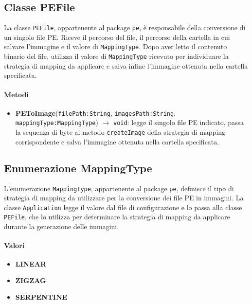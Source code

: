\subsection{Classe PEFile}

La classe \texttt{PEFile}, appartenente al package \texttt{pe}, è
responsabile della conversione di un singolo file PE. Riceve il percorso
del file, il percorso della cartella in cui
salvare l’immagine e il valore di \texttt{MappingType}. Dopo aver letto il
contenuto binario del file, utilizza il valore di \texttt{MappingType}
ricevuto per individuare la strategia di mapping da applicare e salva infine
l’immagine ottenuta nella cartella specificata.

\paragraph{Metodi}

\begin{itemize}
    \raggedright
    \item \textbf{PEToImage}(\texttt{filePath:String},
    \texttt{imagesPath:String}, \texttt{mappingType:MappingType})
    $\rightarrow$ \texttt{void}: legge il singolo file PE indicato,
    passa la sequenza di byte al metodo \texttt{createImage} della strategia di mapping corrispondente 
    e salva l'immagine ottenuta nella cartella specificata.
\end{itemize}

\subsection{Enumerazione MappingType}

L’enumerazione \texttt{MappingType}, appartenente al package \texttt{pe},
definisce il tipo di strategia di mapping da utilizzare per la conversione
dei file PE in immagini. La classe \texttt{Application} legge il valore dal
file di configurazione e lo passa alla classe \texttt{PEFile}, che lo utilizza
per determinare la strategia di mapping da applicare durante la generazione
delle immagini.

\paragraph{Valori}

\begin{itemize}
    \raggedright
    \item \textbf{LINEAR}
    \item \textbf{ZIGZAG}
    \item \textbf{SERPENTINE}
\end{itemize}

